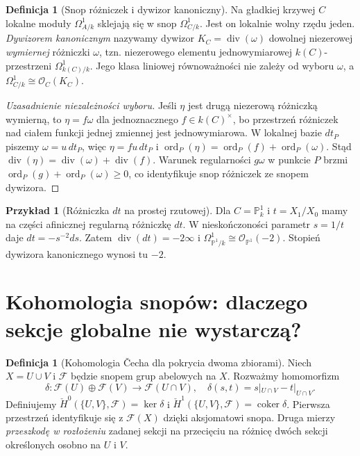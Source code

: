 \documentclass[11pt,a4paper,openany]{report}
\numberwithin{equation}{section}
\theoremstyle{plain}
\theoremstyle{definition}
\newtheorem{definicja}[twierdzenie]{Definicja}
\newtheorem{przyklad}[twierdzenie]{Przykład}
\theoremstyle{remark}
\newcommand{\PP}{\mathbb P}
\begin{document}
\begin{definicja}[Snop różniczek i dywizor kanoniczny]
Na gładkiej krzywej $C$ lokalne moduły
$\Omega^1_{A/k}$ sklejają się w snop
$\Omega^1_{C/k}$. Jest on lokalnie wolny rzędu
jeden. \emph{Dywizorem kanonicznym} nazywamy
dywizor $K_C=\operatorname{div}(\omega)$
dowolnej niezerowej \emph{wymiernej} różniczki
$\omega$, tzn. niezerowego elementu
jednowymiarowej $k(C)$-przestrzeni
$\Omega^1_{k(C)/k}$. Jego klasa liniowej
równoważności nie zależy od wyboru $\omega$,
a $\Omega^1_{C/k}\cong\mathcal O_C(K_C)$.
\end{definicja}

\begin{proof}[Uzasadnienie niezależności wyboru]
Jeśli $\eta$ jest drugą niezerową różniczką wymierną,
to $\eta=f\omega$ dla jednoznacznego $f\in k(C)^\times$,
bo przestrzeń różniczek nad ciałem funkcji jednej
zmiennej jest jednowymiarowa. W lokalnej bazie $dt_P$
piszemy $\omega=u\,dt_P$, więc
$\eta=fu\,dt_P$ i
$\operatorname{ord}_P(\eta)=\operatorname{ord}_P(f)+
\operatorname{ord}_P(\omega)$. Stąd
$\operatorname{div}(\eta)=\operatorname{div}(\omega)+
\operatorname{div}(f)$. Warunek regularności $g\omega$
w punkcie $P$ brzmi
$\operatorname{ord}_P(g)+\operatorname{ord}_P(\omega)\ge0$,
co identyfikuje snop różniczek ze snopem dywizora.
\end{proof}

\begin{przyklad}[Różniczka $dt$ na prostej rzutowej]
Dla $C=\PP^1_k$ i $t=X_1/X_0$ mamy na
części afinicznej regularną różniczkę $dt$.
W nieskończoności parametr $s=1/t$ daje
$dt=-s^{-2}ds$. Zatem
$\operatorname{div}(dt)=-2\infty$ i
$\Omega^1_{\PP^1/k}\cong\mathcal O_{\PP^1}(-2)$.
Stopień dywizora kanonicznego wynosi tu $-2$.
\end{przyklad}

\section{Kohomologia snopów: dlaczego sekcje globalne nie wystarczą?}
\label{sec:cech-curve}

\begin{definicja}[Kohomologia Čecha dla pokrycia dwoma zbiorami]
Niech $X=U\cup V$ i $\mathcal F$ będzie snopem
grup abelowych na $X$. Rozważmy homomorfizm
\[
 \delta:\mathcal F(U)\oplus\mathcal F(V)
 \longrightarrow\mathcal F(U\cap V),\quad
 \delta(s,t)=s|_{U\cap V}-t|_{U\cap V}.
\]
Definiujemy $\check H^0(\{U,V\},\mathcal F)=\ker\delta$
i $\check H^1(\{U,V\},\mathcal F)=\operatorname{coker}\delta$.
Pierwsza przestrzeń identyfikuje się z $\mathcal F(X)$
dzięki aksjomatowi snopa. Druga mierzy \emph{przeszkodę
w rozłożeniu} zadanej sekcji na przecięciu na
różnicę dwóch sekcji określonych osobno na $U$ i $V$.
\end{definicja}
\end{document}
